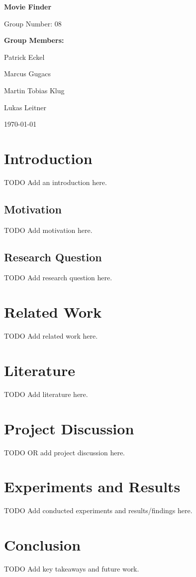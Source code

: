 \documentclass[12pt,a4paper]{article}
\begin{document}
  \begin{titlepage}
    \begin{center}
      \vspace*{2cm}
      {\huge\bfseries Movie Finder\par}
      \vspace{2cm}
      {\Large Group Number: 08\par}
      \vspace{1.5cm}
      {\large\bfseries Group Members:\par}
      \vspace{0.5cm}
      {\large
      Patrick Eckel\par
      Marcus Gugacs\par
      Martin Tobias Klug\par
      Lukas Leitner\par
      }
      \vfill
      {\large \today\par}
    \end{center}
  \end{titlepage}

  \tableofcontents
  \newpage

  \section{Introduction}

  TODO Add an introduction here.

  \subsection{Motivation}

  TODO Add motivation here.

  \subsection{Research Question}

  TODO Add research question here.

  \section{Related Work}

  TODO Add related work here.

  \section{Literature}

  TODO Add literature here.

  \section{Project Discussion}

  TODO OR add project discussion here.

  \section{Experiments and Results}

  TODO Add conducted experiments and results/findings here.

  \section{Conclusion}

  TODO Add key takeaways and future work.
\end{document}
